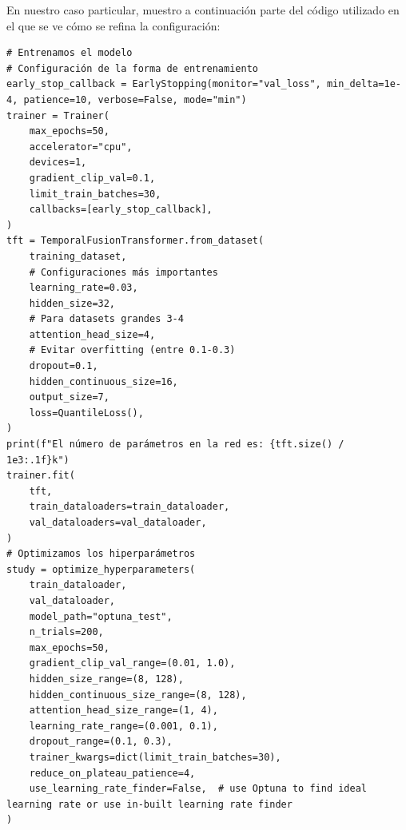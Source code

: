 En nuestro caso particular, muestro a continuación parte del código utilizado en el que se ve cómo se refina la configuración:
\begin{lstlisting}[caption={Código de implementación del modelo TFT.}, label = {TFT_model_implementacion}]
# Entrenamos el modelo
# Configuración de la forma de entrenamiento
early_stop_callback = EarlyStopping(monitor="val_loss", min_delta=1e-4, patience=10, verbose=False, mode="min")
trainer = Trainer(
    max_epochs=50,
    accelerator="cpu",
    devices=1,
    gradient_clip_val=0.1,
    limit_train_batches=30,
    callbacks=[early_stop_callback],
)
tft = TemporalFusionTransformer.from_dataset(
    training_dataset,
    # Configuraciones más importantes
    learning_rate=0.03,
    hidden_size=32,
    # Para datasets grandes 3-4
    attention_head_size=4,
    # Evitar overfitting (entre 0.1-0.3)
    dropout=0.1,
    hidden_continuous_size=16,
    output_size=7,
    loss=QuantileLoss(),
)
print(f"El número de parámetros en la red es: {tft.size() / 1e3:.1f}k")
trainer.fit(
    tft,
    train_dataloaders=train_dataloader,
    val_dataloaders=val_dataloader,
)
# Optimizamos los hiperparámetros
study = optimize_hyperparameters(
    train_dataloader,
    val_dataloader,
    model_path="optuna_test",
    n_trials=200,
    max_epochs=50,
    gradient_clip_val_range=(0.01, 1.0),
    hidden_size_range=(8, 128),
    hidden_continuous_size_range=(8, 128),
    attention_head_size_range=(1, 4),
    learning_rate_range=(0.001, 0.1),
    dropout_range=(0.1, 0.3),
    trainer_kwargs=dict(limit_train_batches=30),
    reduce_on_plateau_patience=4,
    use_learning_rate_finder=False,  # use Optuna to find ideal learning rate or use in-built learning rate finder
)
\end{lstlisting} 
%
%
%
